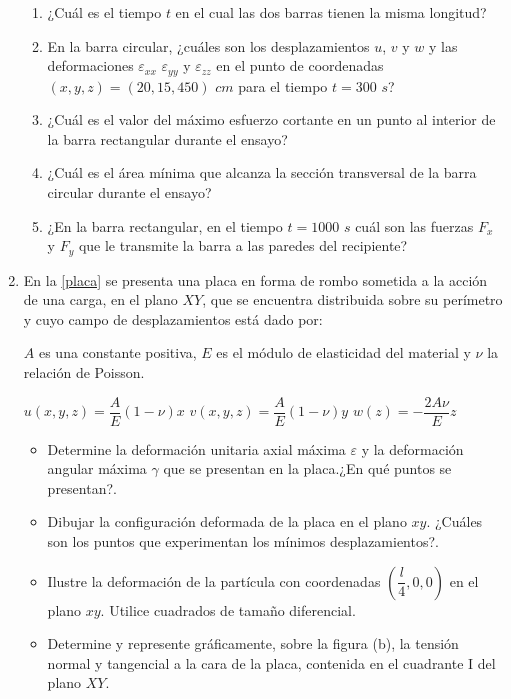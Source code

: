 \documentclass[../notas medios.tex]{subfiles}
\begin{document}
\begin{enumerate}
\begin{enumerate}
	\item ¿Cuál es el tiempo $t$ en el cual las dos barras tienen la misma longitud? \\	
	\item En la barra circular, ¿cuáles son los desplazamientos $u$, $v$ y $w$ y las deformaciones $\varepsilon_{xx}$ $\varepsilon_{yy}$ y $\varepsilon_{zz}$ en el punto de coordenadas $(x,y,z) = (20,15,450)$ $cm$ para el tiempo $t = 300$ $s$? 
	\item ¿Cuál es el valor del máximo esfuerzo cortante en un punto al interior de la barra rectangular durante el ensayo? 	
	\item  ¿Cuál es el área mínima que alcanza la sección transversal de la barra circular durante el ensayo?
	\item  ¿En la barra rectangular, en el tiempo $t=1000$ $s$ cuál son las fuerzas $F_x$ y $F_y$ que le transmite la barra a las paredes del recipiente?
\end{enumerate}

\newpage
\item En la \cref{placa} se presenta una placa en forma de rombo sometida a la acción de una carga, en el plano $XY$, que se encuentra distribuida sobre su perímetro y cuyo campo de desplazamientos está dado por:

$A$ es una constante positiva, $E$  es el módulo de elasticidad del material y $\nu$ la relación de Poisson.

$ u \left(x,y,z \right) =  \dfrac{A}{E}  \left(1 - \nu \right) x$ \hspace*{5mm}
$ v \left(x,y,z \right) = \dfrac{A}{E}  \left(1 - \nu \right) y$	\hspace*{5mm} 
$ w \left(z \right) = -\dfrac{2A \nu}{E} z$
%
\begin{figure}[H]
	\centering
	\hspace{2 cm}
\end{figure}

\begin{itemize}
	\item Determine la deformación unitaria axial máxima $\varepsilon$ y la deformación angular máxima $\gamma$ que se presentan en la placa.¿En qué puntos se presentan?.
	\item Dibujar la configuración deformada de la placa en el plano $xy$. ¿Cuáles son los puntos que experimentan los mínimos desplazamientos?.
	\item Ilustre la deformación de la partícula con coordenadas $\left( \dfrac{l}{4}, 0, 0 \right)$ en el plano $xy$. Utilice cuadrados de tamaño diferencial.
	\item Determine y represente gráficamente, sobre la figura (b), la tensión normal y tangencial a la cara de la placa, contenida en el cuadrante I del plano $XY$.
\end{itemize}

\end{enumerate}
\end{document}
